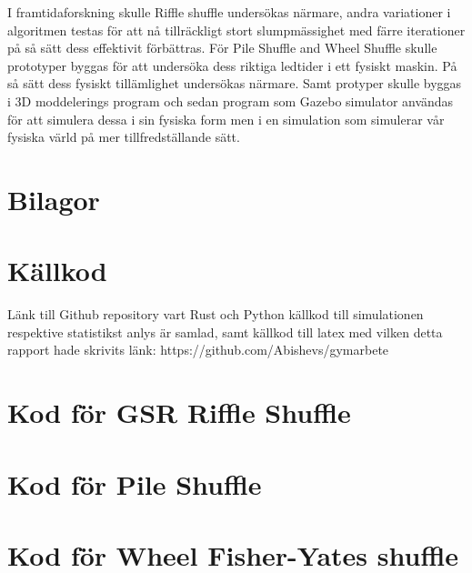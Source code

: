 \documentclass[swedish,a4paper]{article}
\renewcommand{\appendixpagename}{Bilagor}
\begin{document}
I framtidaforskning skulle Riffle shuffle undersökas närmare, andra variationer i
algoritmen testas för att nå tillräckligt stort slumpmässighet med färre
iterationer på så sätt dess effektivit förbättras. För Pile Shuffle and Wheel
Shuffle skulle prototyper byggas för att undersöka dess riktiga ledtider i ett
fysiskt maskin. På så sätt dess fysiskt tillämlighet undersökas närmare. Samt
protyper skulle byggas i 3D moddelerings program och sedan program som Gazebo simulator användas för att simulera dessa i sin fysiska form men i
en simulation som simulerar vår fysiska värld på mer tillfredställande sätt.



\printbibliography[heading=bibintoc, title={Bibliografi}]

\appendix
\section*{\appendixpagename} 
\addcontentsline{toc}{section}{\appendixpagename} 

\section{Källkod}
\label{app:github}
Länk till Github repository vart Rust och Python källkod till simulationen 
respektive statistikst anlys är samlad, samt källkod till latex med
vilken detta rapport hade skrivits
länk: https://github.com/Abishevs/gymarbete

\section{Kod för GSR Riffle Shuffle}
\label{app:gsr}
%


\section{Kod för Pile Shuffle}
\label{app:pile}


\section{Kod för Wheel Fisher-Yates shuffle}
\label{app:wheel}

\end{document}
